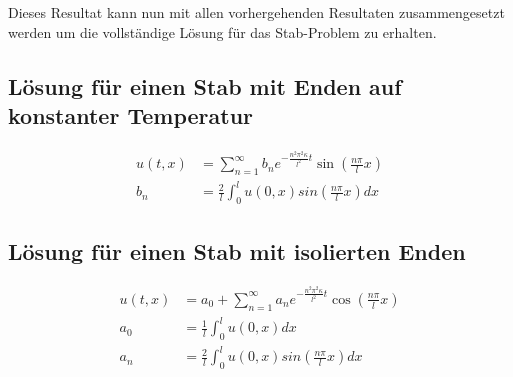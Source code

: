 Dieses Resultat kann nun mit allen vorhergehenden Resultaten zusammengesetzt
werden um die vollständige Lösung für das Stab-Problem zu erhalten.

\subsection{Lösung für einen Stab mit Enden auf konstanter Temperatur}
\[
\begin{aligned}
    u(t,x)
    &=
    \sum_{n=1}^{\infty}b_{n}e^{-\frac{n^{2}\pi^{2}\kappa}{l^{2}}t}
    \sin\left(\frac{n\pi}{l}x\right)
    \\
    b_{n}
    &=
    \frac{2}{l}\int_{0}^{l}u(0,x)sin\left(\frac{n\pi}{l}x\right) dx
\end{aligned}
\]

\subsection{Lösung für einen Stab mit isolierten Enden}
\[
\begin{aligned}
    u(t,x)
    &=
    a_{0} + \sum_{n=1}^{\infty}a_{n}e^{-\frac{n^{2}\pi^{2}\kappa}{l^{2}}t}
    \cos\left(\frac{n\pi}{l}x\right)
    \\
    a_{0}
    &=
    \frac{1}{l}\int_{0}^{l}u(0,x) dx
    \\
    a_{n}
    &=
    \frac{2}{l}\int_{0}^{l}u(0,x)sin\left(\frac{n\pi}{l}x\right) dx
\end{aligned}
\]
